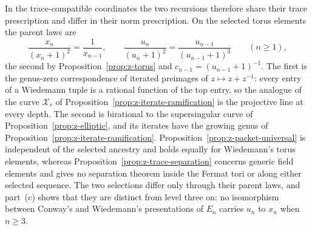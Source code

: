 \documentclass[11pt]{article}
\theoremstyle{definition}
\theoremstyle{remark}
\begin{document}
In the trace-compatible coordinates the two recursions therefore share their
trace prescription and differ in their norm prescription.  On the selected
torus elements the parent laws are
\[
 \frac{x_n}{(x_n+1)^2}=\frac1{x_{n-1}},
 \qquad
 \frac{u_n}{(u_n+1)^2}=\frac{u_{n-1}}{(u_{n-1}+1)^3}
 \qquad(n\geq1),
\]
the second by Proposition~\ref{prop:z-torus} and
$c_{n-1}=(u_{n-1}+1)^{-1}$.  The first is the genus-zero correspondence of
iterated preimages of $z\mapsto z+z^{-1}$: every entry of a Wiedemann tuple
is a rational function of the top entry, so the analogue of the curve
$\mathcal X_r$ of Proposition~\ref{prop:z-iterate-ramification} is the
projective line at every depth.  The second is birational to the
supersingular curve of Proposition~\ref{prop:z-elliptic}, and its iterates
have the growing genus of Proposition~\ref{prop:z-iterate-ramification}.
Proposition~\ref{prop:z-packet-universal} is independent of the selected
ancestry and holds equally for Wiedemann's torus elements, whereas
Proposition~\ref{prop:z-trace-separation} concerns generic field elements
and gives no separation theorem inside the Fermat tori or along either
selected sequence.  The two selections differ only through their parent
laws, and part~(c) shows that they are distinct from level three on: no
isomorphism between Conway's and Wiedemann's presentations of $E_n$ carries
$u_n$ to $x_n$ when $n\geq3$.
\end{document}
